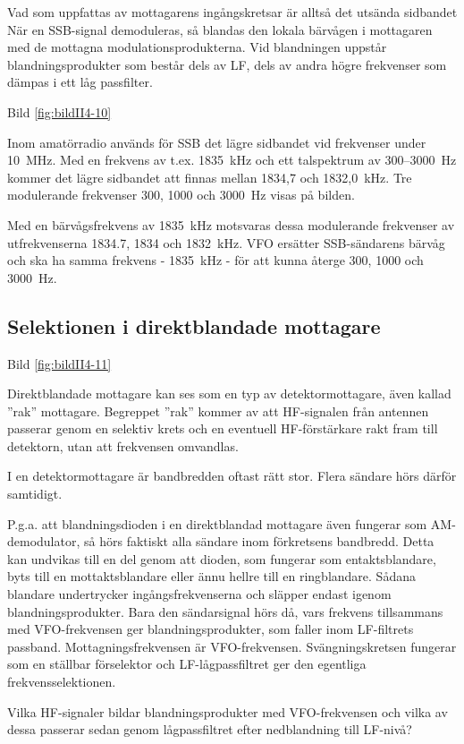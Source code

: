 Vad som uppfattas av mottagarens ingångskretsar är alltså det utsända
sidbandet När en SSB-signal demoduleras, så blandas den lokala
bärvågen i mottagaren med de mottagna modulationsprodukterna.  Vid
blandningen uppstår blandningsprodukter som består dels av LF, dels av
andra högre frekvenser som dämpas i ett låg passfilter.

Bild \ref{fig:bildII4-10}

Inom amatörradio används för SSB det lägre sidbandet vid frekvenser
under 10~MHz.  Med en frekvens av t.ex. 1835~kHz och ett talspektrum
av 300--3000~Hz kommer det lägre sidbandet att finnas mellan 1834,7 och
1832,0~kHz. Tre modulerande frekvenser 300, 1000 och 3000~Hz visas på
bilden.

Med en bärvågsfrekvens av 1835~kHz motsvaras dessa modulerande
frekvenser av utfrekvenserna 1834.7, 1834 och 1832~kHz. VFO ersätter
SSB-sändarens bärvåg och ska ha samma frekvens - 1835~kHz - för att
kunna återge 300, 1000 och 3000~Hz.

\subsection{Selektionen i direktblandade mottagare}

Bild \ref{fig:bildII4-11}

Direktblandade mottagare kan ses som en typ av detektormottagare, även
kallad ''rak'' mottagare. Begreppet ''rak'' kommer av att HF-signalen från
antennen passerar genom en selektiv krets och en eventuell
HF-förstärkare rakt fram till detektorn, utan att frekvensen omvandlas.

I en detektormottagare är bandbredden oftast rätt stor. Flera sändare
hörs därför samtidigt.

P.g.a. att blandningsdioden i en direktblandad mottagare även fungerar
som AM-demodulator, så hörs faktiskt alla sändare inom förkretsens
bandbredd. Detta kan undvikas till en del genom att dioden, som
fungerar som entaktsblandare, byts till en mottaktsblandare eller ännu
hellre till en ringblandare. Sådana blandare undertrycker
ingångsfrekvenserna och släpper endast igenom
blandningsprodukter. Bara den sändarsignal hörs då, vars frekvens
tillsammans med VFO-frekvensen ger blandningsprodukter, som faller
inom LF-filtrets passband. Mottagningsfrekvensen är
VFO-frekvensen. Svängningskretsen fungerar som en ställbar förselektor
och LF-lågpassfiltret ger den egentliga frekvensselektionen.

Vilka HF-signaler bildar blandningsprodukter med VFO-frekvensen och
vilka av dessa passerar sedan genom lågpassfiltret efter nedblandning
till LF-nivå?

